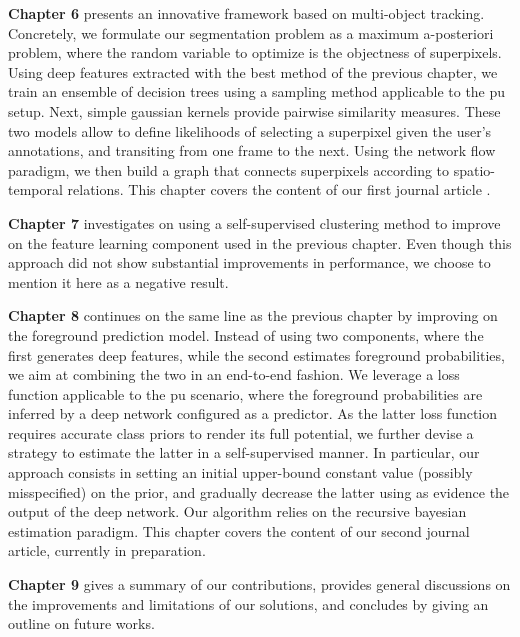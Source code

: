 \textbf{Chapter 6} presents an innovative framework based on multi-object tracking.
Concretely, we formulate our segmentation problem as a maximum a-posteriori problem, where the random variable to optimize is the objectness of superpixels.
Using deep features extracted with the best method of the previous chapter, we train an ensemble of decision trees using a sampling method applicable to the \gls{pu} setup.
Next, simple gaussian kernels provide pairwise similarity measures.
These two models allow to define likelihoods of selecting a superpixel given the user's annotations, and transiting from one frame to the next.
Using the network flow paradigm, we then build a graph that connects superpixels according to spatio-temporal relations.
This chapter covers the content of our first journal article \cite{lejeune18}.

\textbf{Chapter 7} investigates on using a self-supervised clustering method to improve on the feature learning component used in the previous chapter.
Even though this approach did not show substantial improvements in performance, we choose to mention it here as a negative result.

\textbf{Chapter 8} continues on the same line as the previous chapter by improving on the foreground prediction model.
Instead of using two components, where the first generates deep features, while the second estimates foreground probabilities, we aim at combining the two in an end-to-end fashion.
We leverage a loss function applicable to the \gls{pu} scenario, where the foreground probabilities are inferred by a deep network configured as a predictor.
As the latter loss function requires accurate class priors to render its full potential, we further devise a strategy to estimate the latter in a self-supervised manner.
In particular, our approach consists in setting an initial upper-bound constant value (possibly misspecified) on the prior, and gradually decrease the latter using as evidence the output of the deep network.
Our algorithm relies on the recursive bayesian estimation paradigm.
This chapter covers the content of our second journal article, currently in preparation.

\textbf{Chapter 9} gives a summary of our contributions, provides general discussions on the improvements and limitations of our solutions, and concludes by giving an outline on future works.

